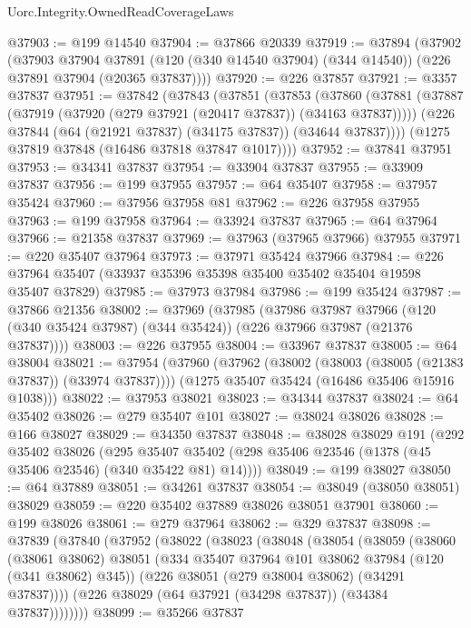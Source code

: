 \begin{lexlean}{Uorc.Integrity.OwnedReadCoverageLaws}
\begin{coremodule}
@37903 := @199 @14540
@37904 := @37866 @20339
@37919 := @37894
    (@37902
      (@37903
        @37904
        @37891
        (@120 (@340 @14540 @37904) (@344 @14540))
        (@226 @37891 @37904 (@20365 @37837))))
@37920 := @226 @37857
@37921 := @3357 @37837
@37951 := @37842
    (@37843
      (@37851
        (@37853
          (@37860
            (@37881 (@37887 (@37919 (@37920 (@279 @37921 (@20417 @37837)) (@34163 @37837)))))
            (@226 @37844 (@64 (@21921 @37837) (@34175 @37837)) (@34644 @37837))))
        (@1275 @37819 @37848 (@16486 @37818 @37847 @1017))))
@37952 := @37841 @37951
@37953 := @34341 @37837
@37954 := @33904 @37837
@37955 := @33909 @37837
@37956 := @199 @37955
@37957 := @64 @35407
@37958 := @37957 @35424
@37960 := @37956 @37958 @81
@37962 := @226 @37958 @37955
@37963 := @199 @37958
@37964 := @33924 @37837
@37965 := @64 @37964
@37966 := @21358 @37837
@37969 := @37963 (@37965 @37966) @37955
@37971 := @220 @35407 @37964
@37973 := @37971 @35424 @37966
@37984 := @226 @37964 @35407 (@33937 @35396 @35398 @35400 @35402 @35404 @19598 @35407 @37829)
@37985 := @37973 @37984
@37986 := @199 @35424
@37987 := @37866 @21356
@38002 := @37969
    (@37985
      (@37986
        @37987
        @37966
        (@120 (@340 @35424 @37987) (@344 @35424))
        (@226 @37966 @37987 (@21376 @37837))))
@38003 := @226 @37955
@38004 := @33967 @37837
@38005 := @64 @38004
@38021 := @37954
    (@37960
      (@37962 (@38002 (@38003 (@38005 (@21383 @37837)) (@33974 @37837))))
      (@1275 @35407 @35424 (@16486 @35406 @15916 @1038)))
@38022 := @37953 @38021
@38023 := @34344 @37837
@38024 := @64 @35402
@38026 := @279 @35407 @101
@38027 := @38024 @38026
@38028 := @166 @38027
@38029 := @34350 @37837
@38048 := @38028
    @38029
    @191
    (@292
      @35402
      @38026
      (@295 @35407 @35402 (@298 @35406 @23546 (@1378 (@45 @35406 @23546) (@340 @35422 @81) @14))))
@38049 := @199 @38027
@38050 := @64 @37889
@38051 := @34261 @37837
@38054 := @38049 (@38050 @38051) @38029
@38059 := @220 @35402 @37889 @38026 @38051 @37901
@38060 := @199 @38026
@38061 := @279 @37964
@38062 := @329 @37837
@38098 := @37839
    (@37840
      (@37952
        (@38022
          (@38023
            (@38048
              (@38054
                (@38059
                  (@38060
                    (@38061 @38062)
                    @38051
                    (@334 @35407 @37964 @101 @38062 @37984 (@120 (@341 @38062) @345))
                    (@226 @38051 (@279 @38004 @38062) (@34291 @37837))))
                (@226 @38029 (@64 @37921 (@34298 @37837)) (@34384 @37837))))))))
@38099 := @35266 @37837

\end{coremodule}
\end{lexlean}
